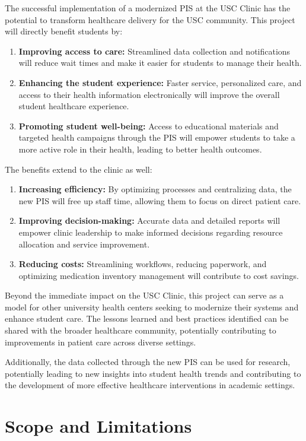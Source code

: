 The successful implementation of a modernized PIS at the USC Clinic has the potential to transform healthcare delivery for the USC community. This project will directly benefit students by:
\begin{enumerate}
    \item \textbf{Improving access to care:} Streamlined data collection and notifications will reduce wait times and make it easier for students to manage their health.
    \item \textbf{Enhancing the student experience:} Faster service, personalized care, and access to their health information electronically will improve the overall student healthcare experience.
    \item \textbf{Promoting student well-being:} Access to educational materials and targeted health campaigns through the PIS will empower students to take a more active role in their health, leading to better health outcomes.
\end{enumerate}

The benefits extend to the clinic as well:
\begin{enumerate}
    \item \textbf{Increasing efficiency:} By optimizing processes and centralizing data, the new PIS will free up staff time, allowing them to focus on direct patient care.
    \item \textbf{Improving decision-making:} Accurate data and detailed reports will empower clinic leadership to make informed decisions regarding resource allocation and service improvement.
    \item \textbf{Reducing costs:} Streamlining workflows, reducing paperwork, and optimizing medication inventory management will contribute to cost savings.
\end{enumerate}

Beyond the immediate impact on the USC Clinic, this project can serve as a model for other university health centers seeking to modernize their systems and enhance student care. The lessons learned and best practices identified can be shared with the broader healthcare community, potentially contributing to improvements in patient care across diverse settings. 

Additionally, the data collected through the new PIS can be used for research, potentially leading to new insights into student health trends and contributing to the development of more effective healthcare interventions in academic settings.

\section{Scope and Limitations}

